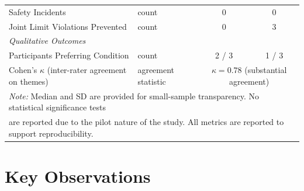 \begin{table}[!h]
\begin{tabular}{llcc}
Safety Incidents & count & 0 & 0 \\
Joint Limit Violations Prevented & count & 0 & 3 \\
\midrule
\multicolumn{4}{l}{\textit{Qualitative Outcomes}} \\
Participants Preferring Condition & count & 2 / 3 & 1 / 3 \\
Cohen's $\kappa$ (inter-rater agreement on themes) & agreement statistic & \multicolumn{2}{c}{$\kappa = 0.78$ (substantial agreement)} \\
\bottomrule
\multicolumn{4}{l}{\footnotesize{\textit{Note:} Median and SD are provided for small-sample transparency. No statistical significance tests}} \\
\multicolumn{4}{l}{\footnotesize{are reported due to the pilot nature of the study. All metrics are reported to support reproducibility.}} \\
\end{tabular}
\end{table}

\section{Key Observations}
\label{appendix:observations}

